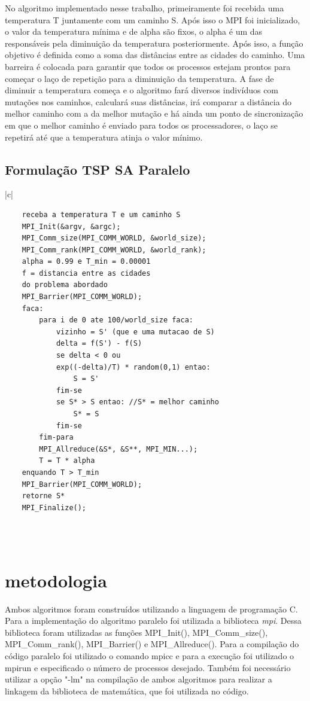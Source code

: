\documentclass[journal]{IEEEtran}
\begin{document}
No algoritmo implementado nesse trabalho, primeiramente foi recebida uma temperatura T juntamente com um caminho S. Após isso o MPI foi inicializado, o valor da temperatura mínima e de alpha são fixos, o alpha é um das responsáveis pela diminuição da temperatura posteriormente. Após isso, a função objetivo é definida como a soma das distâncias entre as cidades do caminho. Uma barreira é colocada para garantir que todos os processos estejam prontos para começar o laço de repetição para a diminuição da temperatura. A fase de diminuir a temperatura começa e o algoritmo fará diversos indivíduos com mutações nos caminhos, calculará suas distâncias, irá comparar a distância do melhor caminho com a da melhor mutação e há ainda um ponto de sincronização em que o melhor caminho é enviado para todos os processadores, o laço se repetirá até que a temperatura atinja o valor mínimo.


\subsection{Formulação TSP SA Paralelo}
\label{formulacao_parsatsp}
\begin{table}[H]
    \centering
    \begin{tabular}{|c|}\hline
     \begin{lstlisting} 
    receba a temperatura T e um caminho S
    MPI_Init(&argv, &argc);
    MPI_Comm_size(MPI_COMM_WORLD, &world_size);
    MPI_Comm_rank(MPI_COMM_WORLD, &world_rank);
    alpha = 0.99 e T_min = 0.00001
    f = distancia entre as cidades
    do problema abordado
    MPI_Barrier(MPI_COMM_WORLD);
    faca:
        para i de 0 ate 100/world_size faca:
            vizinho = S' (que e uma mutacao de S)
            delta = f(S') - f(S)
            se delta < 0 ou 
            exp((-delta)/T) * random(0,1) entao:
                S = S'
            fim-se
            se S* > S entao: //S* = melhor caminho
                S* = S
            fim-se
        fim-para
        MPI_Allreduce(&S*, &S**, MPI_MIN...);
        T = T * alpha
    enquando T > T_min
    MPI_Barrier(MPI_COMM_WORLD);
    retorne S*
    MPI_Finalize();
    
\end{lstlisting} \\
         \hline
    \end{tabular}
    \label{tab:pseudo_seq}
\end{table}

\section{metodologia}
Ambos algoritmos foram construídos utilizando a linguagem de programação C. Para a implementação do algoritmo paralelo foi utilizada a biblioteca \textit{mpi}. Dessa biblioteca foram utilizadas as funções MPI\_Init(), MPI\_Comm\_size(), MPI\_Comm\_rank(), MPI\_Barrier() e MPI\_Allreduce(). Para a compilação do código paralelo foi utilizado o comando mpicc e para a execução foi utilizado o mpirun e especificado o número de processos desejado. Também foi necessário utilizar a opção "-lm" na compilação de ambos algoritmos para realizar a linkagem da biblioteca de matemática, que foi utilizada no código.
\end{document}
